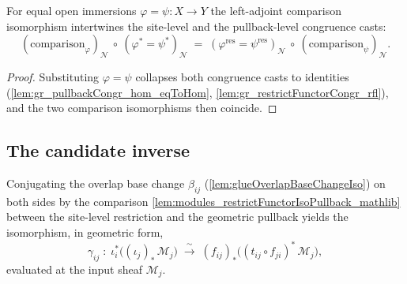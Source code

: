\begin{lemma}
  \label{lem:gr_restrictIsoPullback_congr}
  For equal open immersions \(\varphi = \psi : X \to Y\) the left-adjoint comparison
  isomorphism intertwines the site-level and the pullback-level congruence casts:
  \[
    (\text{comparison}_\varphi)_{\mathcal{N}}\ \circ\
      (\varphi^{*}\!=\psi^{*})_{\mathcal{N}}
    \;=\;
    (\varphi^{\mathrm{res}}\!=\psi^{\mathrm{res}})_{\mathcal{N}}\ \circ\
      (\text{comparison}_\psi)_{\mathcal{N}}.
  \]
\end{lemma}
\begin{proof}
  \leanok
  Substituting \(\varphi = \psi\) collapses both congruence casts to identities
  (\cref{lem:gr_pullbackCongr_hom_eqToHom}, \cref{lem:gr_restrictFunctorCongr_rfl}),
  and the two comparison isomorphisms then coincide.
\end{proof}

\subsection{The candidate inverse}

\begin{definition}
  \label{def:gr_glueOverlapFactorIso}
  Conjugating the overlap base change \(\beta_{ij}\)
  (\cref{lem:glueOverlapBaseChangeIso}) on both sides by the comparison
  \cref{lem:modules_restrictFunctorIsoPullback_mathlib} between the site-level
  restriction and the geometric pullback yields the isomorphism, in geometric form,
  \[
    \gamma_{ij} \;:\;
      \iota_i^{*}\bigl((\iota_j)_{*}\,\mathcal{M}_j\bigr)
        \;\xrightarrow{\ \sim\ }\;
      (f_{ij})_{*}\bigl((t_{ij}\circ f_{ji})^{*}\,\mathcal{M}_j\bigr),
  \]
  evaluated at the input sheaf \(\mathcal{M}_j\).
\end{definition}

